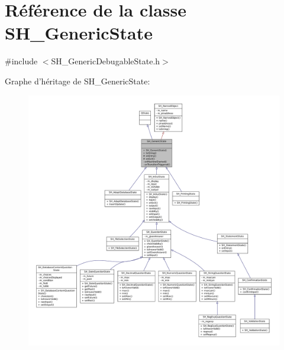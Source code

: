 \hypertarget{classSH__GenericState}{\section{Référence de la classe S\-H\-\_\-\-Generic\-State}
\label{classSH__GenericState}
}


{\ttfamily \#include $<$S\-H\-\_\-\-Generic\-Debugable\-State.\-h$>$}



Graphe d'héritage de S\-H\-\_\-\-Generic\-State\-:\nopagebreak
\begin{figure}[H]
\begin{center}
\leavevmode
\includegraphics[width=350pt]{classSH__GenericState__inherit__graph}
\end{center}
\end{figure}


